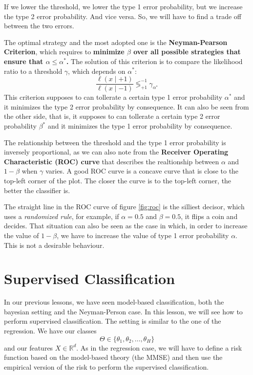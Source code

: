 If we lower the threshold, we lower the type 1 error probability, but we increase the type 2 error probability. And vice versa.
So, we will have to find a trade off between the two errors.

The optimal strategy and the most adopted one is the \textbf{Neyman-Pearson Criterion}, which requires to \textbf{minimize $\beta$ over all possible strategies that ensure that $\alpha \leq \alpha^\ast$.}
The solution of this criterion is to compare the likelihood ratio to a threshold $\gamma$, which depends on $\alpha^\ast$:
\[
    \frac{\ell(x \mid +1)}{\ell(x \mid -1)} \lessgtr^{-1}_{+1} \gamma_{\alpha^\ast}
\]
This criterion supposes to can tollerate a certain type 1 error probability $\alpha^\ast$ and it minimizes the type 2 error probability by consequence. It can also be seen from the other side, that is, it supposes to can tollerate a certain type 2 error probability $\beta^\ast$ and it minimizes the type 1 error probability by consequence.

The relationship between the threshold and the type 1 error probability is inversely proportional, as we can also note from the \textbf{Receiver Operating Characteristic (ROC) curve} that describes the realtionship between $\alpha$ and $1-\beta$ when $\gamma$ varies.
A good ROC curve is a concave curve that is close to the top-left corner of the plot. The closer the curve is to the top-left corner, the better the classifier is.


The straight line in the ROC curve of figure \ref{fig:roc} is the silliest decisor, which uses a \textit{randomized rule}, for example, if $\alpha=0.5$ and $\beta=0.5$, it flips a coin and decides.
That situation can also be seen as the case in which, in order to increase the value of $1-\beta$, we have to increase the value of type 1 error probability $\alpha$. This is not a desirable behaviour.

\section{Supervised Classification}
In our previous lessons, we have seen model-based classification, both the bayesian setting and the Neyman-Person case. In this lesson, we will see how to perform supervised classification. The setting is similar to the one of the regression.
We have our classes
\[
    \Theta \in \{\theta_1, \theta_2, \dots, \theta_H\}
\]
and our features $X \in \mathbb{R}^d$. As in the regression case, we will have to define a risk function based on the model-based theory (the MMSE) and then use the empirical version of the risk to perform the supervised classification.

